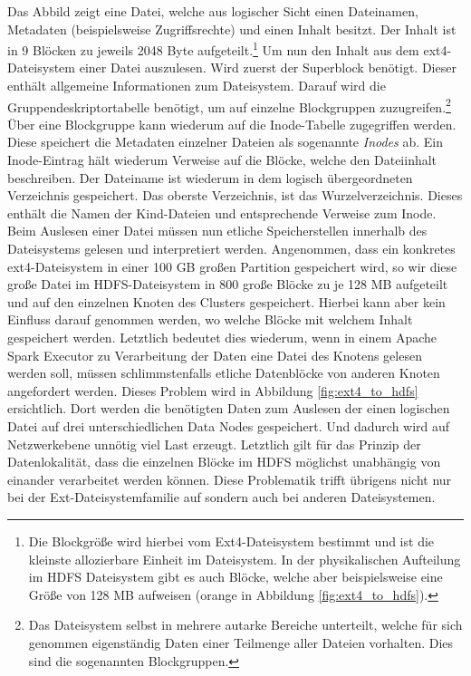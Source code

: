 \noindent
Das Abbild zeigt eine Datei, welche aus logischer Sicht einen Dateinamen, Metadaten (beispielsweise Zugriffsrechte) und einen Inhalt besitzt. Der Inhalt ist in 9 Blöcken zu jeweils 2048 Byte aufgeteilt.\footnote{Die Blockgröße wird hierbei vom Ext4-Dateisystem bestimmt und ist die kleinste allozierbare Einheit im Dateisystem. In der physikalischen Aufteilung im HDFS Dateisystem gibt es auch Blöcke, welche aber beispielsweise eine Größe von 128 MB aufweisen (orange in Abbildung \ref{fig:ext4_to_hdfs}).} Um nun den Inhalt aus dem ext4-Dateisystem einer Datei auszulesen. Wird zuerst der Superblock benötigt. Dieser enthält allgemeine Informationen zum Dateisystem. Darauf wird die Gruppendeskriptortabelle benötigt, um auf einzelne Blockgruppen zuzugreifen.\footnote{Das Dateisystem selbst in mehrere autarke Bereiche unterteilt, welche für sich genommen eigenständig Daten einer Teilmenge aller Dateien vorhalten. Dies sind die sogenannten Blockgruppen.} Über eine Blockgruppe kann wiederum auf die Inode-Tabelle zugegriffen werden. Diese speichert die Metadaten einzelner Dateien als sogenannte \textit{Inodes} ab. Ein Inode-Eintrag hält wiederum Verweise auf die Blöcke, welche den Dateiinhalt beschreiben. Der Dateiname ist wiederum in dem logisch übergeordneten Verzeichnis gespeichert. Das oberste Verzeichnis, ist das Wurzelverzeichnis. Dieses enthält die Namen der Kind-Dateien und entsprechende Verweise zum Inode.\\
Beim Auslesen einer Datei müssen nun etliche Speicherstellen innerhalb des Dateisystems gelesen und interpretiert werden. Angenommen, dass ein konkretes ext4-Dateisystem in einer 100 GB großen Partition gespeichert wird, so wir diese große Datei im HDFS-Dateisystem in 800 große Blöcke zu je 128 MB aufgeteilt und auf den einzelnen Knoten des Clusters gespeichert. Hierbei kann aber kein Einfluss darauf genommen werden, wo welche Blöcke mit welchem Inhalt gespeichert werden. Letztlich bedeutet dies wiederum, wenn in einem Apache Spark Executor zu Verarbeitung der Daten eine Datei des Knotens gelesen werden soll, müssen schlimmstenfalls etliche Datenblöcke von anderen Knoten angefordert werden. Dieses Problem wird in Abbildung \ref{fig:ext4_to_hdfs} ersichtlich. Dort werden die benötigten Daten zum Auslesen der einen logischen Datei auf drei unterschiedlichen Data Nodes gespeichert. Und dadurch wird auf Netzwerkebene unnötig viel Last erzeugt. Letztlich gilt für das Prinzip der Datenlokalität, dass die einzelnen Blöcke im HDFS möglichst unabhängig von einander verarbeitet werden können. Diese Problematik trifft übrigens nicht nur bei der Ext-Dateisystemfamilie auf sondern auch bei anderen Dateisystemen.\\

